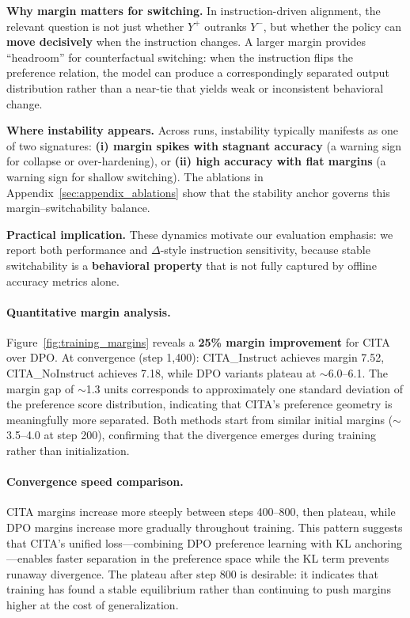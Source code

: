 \vspace{-0.2em}
\noindent\textbf{Why margin matters for switching.}
In instruction-driven alignment, the relevant question is not just whether $Y^+$ outranks $Y^-$, but whether the policy can \textbf{move decisively} when the instruction changes.
A larger margin provides ``headroom'' for counterfactual switching:
when the instruction flips the preference relation, the model can produce a correspondingly separated output distribution rather than a near-tie that yields weak or inconsistent behavioral change.

\vspace{-0.2em}
\noindent\textbf{Where instability appears.}
Across runs, instability typically manifests as one of two signatures:
\textbf{(i) margin spikes with stagnant accuracy} (a warning sign for collapse or over-hardening), or
\textbf{(ii) high accuracy with flat margins} (a warning sign for shallow switching).
The ablations in Appendix~\ref{sec:appendix_ablations} show that the stability anchor governs this margin--switchability balance.

\vspace{-0.2em}
\noindent\textbf{Practical implication.}
These dynamics motivate our evaluation emphasis:
we report both performance and $\Delta$-style instruction sensitivity, because stable switchability is a \textbf{behavioral property} that is not fully captured by offline accuracy metrics alone.

\paragraph{Quantitative margin analysis.}
Figure~\ref{fig:training_margins} reveals a \textbf{25\% margin improvement} for \textsc{CITA} over DPO.
At convergence (step 1,400): \textsc{CITA}\_Instruct achieves margin 7.52, \textsc{CITA}\_NoInstruct achieves 7.18, while DPO variants plateau at $\sim$6.0--6.1.
The margin gap of $\sim$1.3 units corresponds to approximately one standard deviation of the preference score distribution, indicating that \textsc{CITA}'s preference geometry is meaningfully more separated.
Both methods start from similar initial margins ($\sim$3.5--4.0 at step 200), confirming that the divergence emerges during training rather than initialization.

\paragraph{Convergence speed comparison.}
\textsc{CITA} margins increase more steeply between steps 400--800, then plateau, while DPO margins increase more gradually throughout training.
This pattern suggests that \textsc{CITA}'s unified loss---combining DPO preference learning with KL anchoring---enables faster separation in the preference space while the KL term prevents runaway divergence.
The plateau after step 800 is desirable: it indicates that training has found a stable equilibrium rather than continuing to push margins higher at the cost of generalization.

